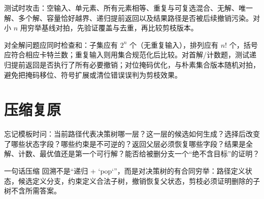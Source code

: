 \documentclass[UTF8,fontset=none,11pt,a4paper]{ctexart}
\begin{document}
测试时攻击：空输入、单元素、所有元素相等、重复与可复选混合、无解、唯一解、多个解、容量恰好越界、递归提前返回以及结果路径是否被后续撤销污染。对小 $n$ 用穷举基线对拍，先验证覆盖与去重，再比较剪枝版本。

对全解问题应同时检查和：子集应有 $2^n$ 个（无重复输入），排列应有 $n!$ 个，括号应符合相应卡特兰数；重复输入则用集合规范化后比较。对首解/计数题，测试递归提前返回是否执行了所有必要撤销；对位掩码优化，与朴素集合版本随机对拍，避免把掩码移位、符号扩展或清位错误误判为剪枝效果。

\section{压缩复原}

忘记模板时问：当前路径代表决策树哪一层？这一层的候选如何生成？选择后改变了哪些状态字段？哪些约束是不可逆的？返回父层必须恢复哪些字段？结果是全解、计数、最优值还是第一个可行解？能否给被删分支一个“绝不含目标”的证明？

\begin{corebox}{一句话压缩}
回溯不是“递归 + `pop`”，而是对决策树的有合同穷举：路径定义状态，候选定义分支，约束定义合法子树，撤销恢复父状态，剪枝必须证明删除的子树不含所需答案。
\end{corebox}
\end{document}
